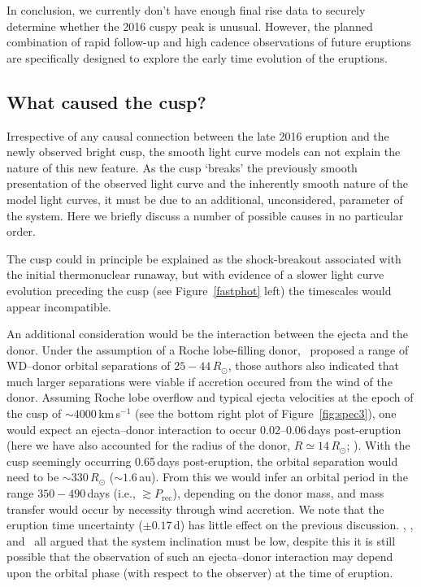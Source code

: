 \documentclass[twocolumn,tighten]{aastex6}
\newcommand{\othreek}{\citetalias{2016ApJ...833..149D}}
\newcommand{\hstspec}{\citetalias{2017ApJ...847...35D}}
\newcommand{\hstphot}{\citetalias{2017ApJ...849...96D}}
\begin{document}
In conclusion, we currently don't have enough final rise data to securely determine whether the 2016 cuspy peak is unusual. However, the planned combination of rapid follow-up and high cadence observations of future eruptions are specifically designed to explore the early time evolution of the eruptions.

\subsection{What caused the cusp?}\label{cusp}

Irrespective of any causal connection between the late 2016 eruption and the newly observed bright cusp, the smooth light curve models can not explain the nature of this new feature.  As the cusp `breaks' the previously smooth presentation of the observed light curve and the inherently smooth nature of the model light curves, it must be due to an additional, unconsidered, parameter of the system.  Here we briefly discuss a number of possible causes in no particular order.

The cusp could in principle be explained as the shock-breakout associated with the initial thermonuclear runaway, but with evidence of a slower light curve evolution preceding the cusp (see Figure~\ref{fastphot} left) the timescales would appear incompatible. 

An additional consideration would be the interaction between the ejecta and the donor.  Under the assumption of a Roche lobe-filling donor, \hstphot\ proposed a range of WD--donor orbital separations of $25-44\,R_\odot$,  those authors also indicated that much larger separations were viable if accretion occured from the wind of the donor.  Assuming Roche lobe overflow and typical ejecta velocities at the epoch of the cusp of $\sim4000$\,km\,s$^{-1}$ (see the bottom right plot of Figure~\ref{fig:spec3}), one would expect an ejecta--donor interaction to occur 0.02--0.06\,days post-eruption (here we have also accounted for the radius of the donor, $R\simeq14\,R_\odot$; \hstphot).   With the cusp seemingly occurring 0.65\,days post-eruption, the orbital separation would need to be $\sim330\,R_\odot$ ($\sim1.6$\,au). From this we would infer an orbital period in the range $350-490$\,days (i.e., $\gtrsim P_\mathrm{rec}$), depending on the donor mass, and mass transfer would occur by necessity through wind accretion.  We note that the eruption time uncertainty ($\pm0.17$\,d) has little effect on the previous discussion. \othreek, \hstspec, and \hstphot\ all argued that the system inclination must be low, despite this it is still possible that the observation of such an ejecta--donor interaction may depend upon the orbital phase (with respect to the observer) at the time of eruption.
\end{document}
